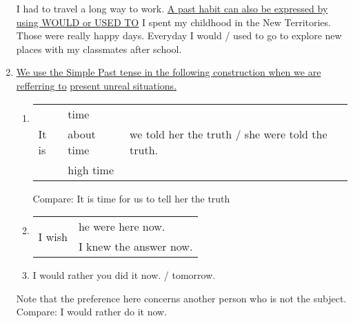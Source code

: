 \begin{enumerate}
        I had to travel a long way to work.
        \newline
        \newline
        \underline{A past habit can also be expressed by using WOULD or USED TO}
        \newline
        I spent my childhood in the New Territories. Those were really happy
        days. Everyday I would / used to go to explore new places with my
        classmates after school.
    \item \underline{We use the Simple Past tense in the following construction
        when we are refferring to}
        \newline
        \underline{present unreal situations.}
        \begin{enumerate}
            \item
                \begin{tabular}{lll}
                    \multirow{3}{*}{It is} & time       & \multirow{3}{*}{we
                    told her the truth / she were told the truth.} \\
                                           & about time & \\
                                           & high time  &
                \end{tabular}
                \newline
                Compare: It is time for us to tell her the truth
            \item
                \begin{tabular}{ll}
                    \multirow{2}{*}{I wish} & he were here now. \\
                    & I knew the answer now.
                \end{tabular}
            \item I would rather you did it now. / tomorrow.
        \end{enumerate}
        Note that the preference here concerns another person who is not the
        subject.
        \newline
        Compare: I would rather do it now.
\end{enumerate}

\newpage
